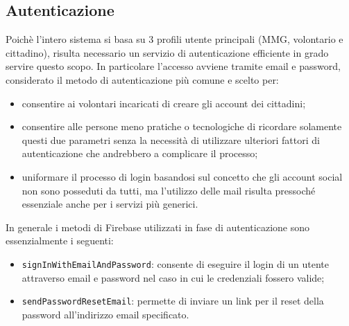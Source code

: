 \documentclass[12pt,a4paper,twoside,openright,titlepage]{book}
\begin{document}
\subsection{Autenticazione}
Poichè l'intero sistema si basa su 3 profili utente principali (MMG, volontario e cittadino), risulta necessario un servizio di autenticazione efficiente in grado servire questo scopo. In particolare l'accesso avviene tramite email e password, considerato il metodo di autenticazione più comune e scelto per:
\begin{itemize}
\item consentire ai volontari incaricati di creare gli account dei cittadini;
\item consentire alle persone meno pratiche o tecnologiche di ricordare solamente questi due parametri senza la necessità di utilizzare ulteriori fattori di autenticazione che andrebbero a complicare il processo;
\item uniformare il processo di login basandosi sul concetto che gli account social non sono posseduti da tutti, ma l'utilizzo delle mail risulta pressoché essenziale anche per i servizi più generici.
\end{itemize}
In generale i metodi di Firebase utilizzati in fase di autenticazione sono essenzialmente i seguenti:
\begin{itemize}
\item \texttt{signInWithEmailAndPassword}: consente di eseguire il login di un utente attraverso email e password nel caso in cui le credenziali fossero valide;
\item \texttt{sendPasswordResetEmail}: permette di inviare un link per il reset della password all'indirizzo email specificato.
\end{itemize}
\end{document}
